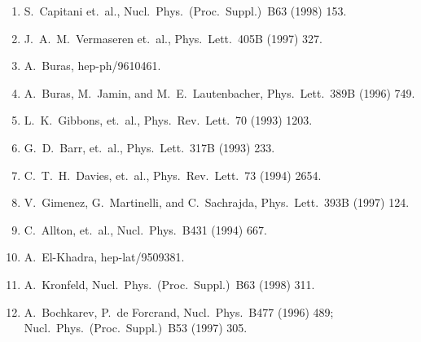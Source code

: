 \begin{enumerate}
\item S.~Capitani et.\ al., Nucl.\ Phys.\ (Proc.\ Suppl.)\ B63 (1998) 153.
\item J.~A.~M.~Vermaseren et.\ al., Phys.\ Lett.\ 405B (1997) 327.
\item A.~Buras, hep-ph/9610461.
\item A.~Buras, M.~Jamin, and M.~E.~Lautenbacher, Phys.\ Lett.\ 389B (1996) 749.
\item L.~K.~Gibbons, et.\ al., Phys.\ Rev.\ Lett.\ 70 (1993) 1203.
\item G.~D.~Barr, et.\ al., Phys.\ Lett.\ 317B (1993) 233.
\item C.~T.~H.~Davies, et.\ al., Phys.\ Rev.\ Lett.\ 73 (1994) 2654.
\item V.~Gimenez, G.~Martinelli, and C.~Sachrajda, Phys.\ Lett.\ 393B (1997) 124.
\item C.~Allton, et.\ al., Nucl.\ Phys.\ B431 (1994) 667.
\item A.~El-Khadra, hep-lat/9509381.
\item A.~Kronfeld, Nucl.\ Phys.\ (Proc.\ Suppl.)\ B63 (1998) 311.
\item A.~Bochkarev, P.~de Forcrand, Nucl.\ Phys.\ B477 (1996) 489; Nucl.\ Phys.\ (Proc.\ Suppl.)\ B53 (1997) 305.
\end{enumerate}
